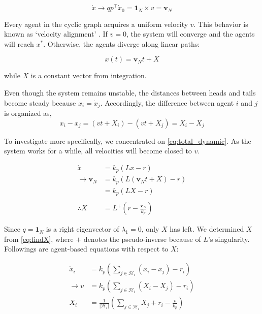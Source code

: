 \documentclass[letterpaper, 10 pt, conference]{ieeeconf}  %
\begin{document}
\begin{equation}\label{eq:v_N}
    \dot{x} \rightarrow qp^\top \dot{x}_0 = \mathbf{1}_N \times v = \mathbf{v}_N
\end{equation}

\noindent Every agent in the cyclic graph acquires a uniform velocity \( v \). This behavior is known as `velocity alignment' \cite{dimarogonas_connection_2008}. If \( v = 0 \), the system will converge and the agents will reach \( x^* \). Otherwise, the agents diverge along linear paths:

\[
x(t) = \mathbf{v}_N t + X 
\]

\noindent while \( X \) is a constant vector from integration.


Even though the system remains unstable, the distances between heads and tails become steady because \( \dot{x}_i = \dot{x}_j \). Accordingly, the difference between agent $i$ and $j$ is organized as,
\[
x_i - x_j = (vt + X_i) - (vt +X_j) = X_i-X_j
\]

To investigate more specifically, we concentrated on \eqref{eq:total_dynamic}. As the system works for a while, all velocities will become closed to \(v\). 

\begin{equation}\label{eq:findX}
\begin{split}
    \dot{x} &= k_p(Lx - r) \\
   \rightarrow  \mathbf{v}_N &= k_p(L(\mathbf{v}_Nt + X) - r) \\
           &= k_p(LX - r)  \\ \\
 \therefore X &= L^+ (r - \frac{\mathbf{v}_N}{k_p})
\end{split}
\end{equation}

Since \(q=\mathbf{1}_N\) is a right eigenvector of \(\lambda_1 = 0\), only \(X\) has left. We determined \( X \) from \eqref{eq:findX}, where \( + \) denotes the pseudo-inverse because of \( L \)'s singularity. Followings are agent-based equations with respect to \(X\):

\begin{equation}
    \begin{split}
    \dot{x}_i &= k_p(\sum_{j \in \mathcal{H}_i} (x_i - x_j) -r_i) \\
    \rightarrow v &= k_p(\sum_{j \in \mathcal{H}_i} (X_i - X_j) - r_i) \\
    X_i &= \frac{1}{|\mathcal{H}_i|}(\sum_{j \in \mathcal{H}_i} X_j +r_i-\frac{v}{k_p})
    \end{split}
\end{equation}
\end{document}
